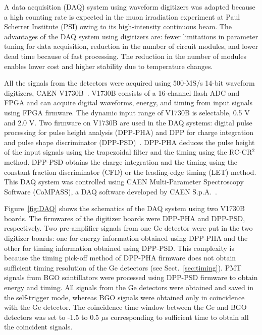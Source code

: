 A data acquisition (DAQ) system using waveform digitizers was adapted because a high counting rate is expected in the muon irradiation experiment at Paul Scherrer Institute (PSI) owing to its high-intensity continuous beam.
The advantages of the DAQ system using digitizers are: fewer limitations in parameter tuning for data acquisition,
reduction in the number of circuit modules, and lower dead time because of fast processing.
The reduction in the number of modules enables lower cost and higher stability due to temperature changes.

All the signals from the detectors were acquired using 500-MS/s 14-bit waveform digitizers, CAEN V1730B~\cite{V1730B}.
V1730B consists of a 16-channel flash ADC and FPGA and can acquire digital waveforms, energy, and timing from input signals using FPGA firmware.
The dynamic input range of V1730B is selectable, 0.5 V and 2.0 V.
Two firmware on V1730B are used in the DAQ systems: digital pulse processing for pulse height analysis (DPP-PHA) 
and DPP for charge integration and pulse shape discriminator (DPP-PSD)~\cite{DPP-PHAandPSD}.
DPP-PHA deduces the pulse height of the input signals using the trapezoidal filter and the timing using the RC-CR$^2$ method.
DPP-PSD obtains the charge integration and the timing using the constant fraction discriminator (CFD) or the leading-edge timing (LET) method.
This DAQ system was controlled using CAEN Multi-Parameter Spectroscopy Software (CoMPASS), a DAQ software developed by CAEN S.p.A.~\cite{CoMPASS}.

Figure~\ref{fig:DAQ} shows the schematics of the DAQ system using two V1730B boards.
The firmwares of the digitizer boards were DPP-PHA and DPP-PSD, respectively.
Two pre-amplifier signals from one Ge detector were put in the two digitizer boards:
one for energy information obtained using DPP-PHA and the other for timing information obtained using DPP-PSD.
This complexity is because the timing pick-off method of DPP-PHA firmware does not obtain sufficient timing resolution of the Ge detectors (see Sect.~\ref{sec:timing}). 
PMT signals from BGO scintillators were processed using DPP-PSD firmware to obtain energy and timing.
All signals from the Ge detectors were obtained and saved in the self-trigger mode, 
whereas BGO signals were obtained %
only in coincidence with the Ge detector. 
The coincidence time window between the Ge and BGO detectors was set to -1.5 to 0.5 $\mu$s corresponding to sufficient time to obtain all the coincident signals. %

